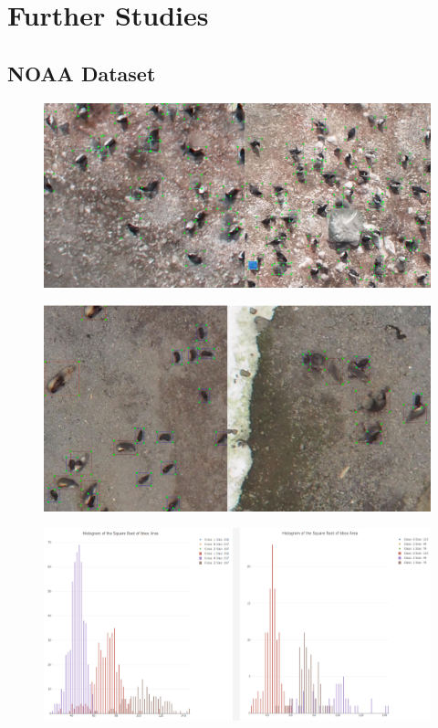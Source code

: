 
\chapter{Further Studies} %

\label{Chapter6}


\section{NOAA Dataset}


\begin{figure}[ht]
\includegraphics[width=1.0\textwidth]{Figures/Penguins.png}
\caption{}
\label{fig:Penguins}
\end{figure}

\begin{figure}[ht]
\includegraphics[width=1.0\textwidth]{Figures/Seals.png}
\caption{}
\label{fig:Seals}
\end{figure}

\begin{figure}[ht]
\includegraphics[width=1.0\textwidth]{Figures/SealStats.png}
\caption{}
\label{fig:SealStats}
\end{figure}
